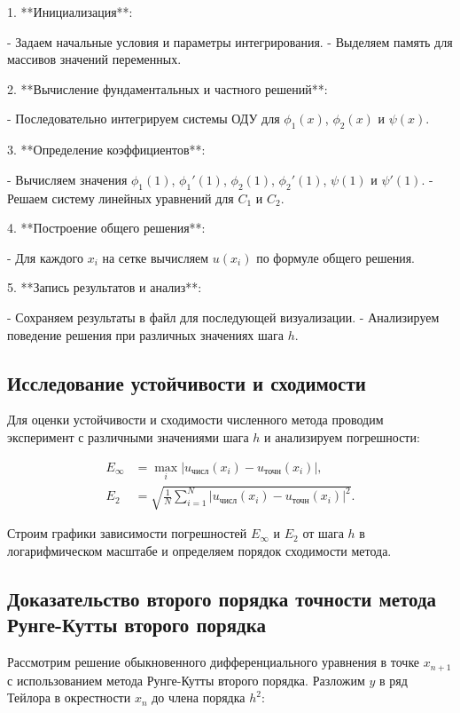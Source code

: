 \documentclass{article}
\begin{document}
1. **Инициализация**:

   - Задаем начальные условия и параметры интегрирования.
   - Выделяем память для массивов значений переменных.

2. **Вычисление фундаментальных и частного решений**:

   - Последовательно интегрируем системы ОДУ для $\phi_1(x)$, $\phi_2(x)$ и $\psi(x)$.

3. **Определение коэффициентов**:

   - Вычисляем значения $\phi_1(1)$, $\phi_1'(1)$, $\phi_2(1)$, $\phi_2'(1)$, $\psi(1)$ и $\psi'(1)$.
   - Решаем систему линейных уравнений для $C_1$ и $C_2$.

4. **Построение общего решения**:

   - Для каждого $x_i$ на сетке вычисляем $u(x_i)$ по формуле общего решения.

5. **Запись результатов и анализ**:

   - Сохраняем результаты в файл для последующей визуализации.
   - Анализируем поведение решения при различных значениях шага $h$.

\subsection{Исследование устойчивости и сходимости}

Для оценки устойчивости и сходимости численного метода проводим эксперимент с различными значениями шага $h$ и анализируем погрешности:

\begin{align}
E_{\infty} &= \max_{i} |u_{\text{числ}}(x_i) - u_{\text{точн}}(x_i)|, \\
E_2 &= \sqrt{\frac{1}{N} \sum_{i=1}^{N} |u_{\text{числ}}(x_i) - u_{\text{точн}}(x_i)|^2}.
\end{align}

Строим графики зависимости погрешностей $E_{\infty}$ и $E_2$ от шага $h$ в логарифмическом масштабе и определяем порядок сходимости метода.

\subsection{Доказательство второго порядка точности метода Рунге-Кутты второго порядка}

Рассмотрим решение обыкновенного дифференциального уравнения в точке $x_{n+1}$ с использованием метода Рунге-Кутты второго порядка. Разложим $y$ в ряд Тейлора в окрестности $x_n$ до члена порядка $h^2$:
\end{document}
